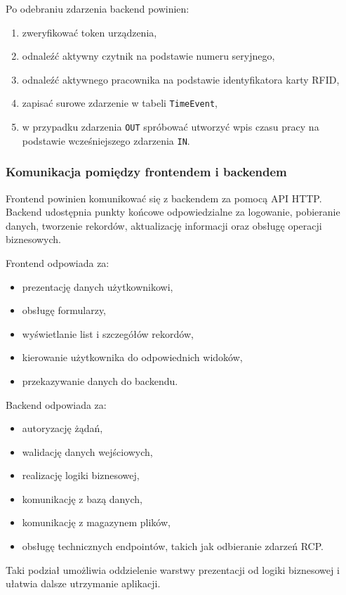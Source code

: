 Po odebraniu zdarzenia backend powinien:
\begin{enumerate}
    \item zweryfikować token urządzenia,
    \item odnaleźć aktywny czytnik na podstawie numeru seryjnego,
    \item odnaleźć aktywnego pracownika na podstawie identyfikatora karty RFID,
    \item zapisać surowe zdarzenie w tabeli \texttt{TimeEvent},
    \item w przypadku zdarzenia \texttt{OUT} spróbować utworzyć wpis czasu pracy na podstawie wcześniejszego zdarzenia \texttt{IN}.
\end{enumerate}

\subsubsection{Komunikacja pomiędzy frontendem i backendem}

Frontend powinien komunikować się z backendem za pomocą API HTTP. Backend udostępnia punkty końcowe odpowiedzialne za logowanie, pobieranie danych, tworzenie rekordów, aktualizację informacji oraz obsługę operacji biznesowych.

Frontend odpowiada za:
\begin{itemize}
    \item prezentację danych użytkownikowi,
    \item obsługę formularzy,
    \item wyświetlanie list i szczegółów rekordów,
    \item kierowanie użytkownika do odpowiednich widoków,
    \item przekazywanie danych do backendu.
\end{itemize}

Backend odpowiada za:
\begin{itemize}
    \item autoryzację żądań,
    \item walidację danych wejściowych,
    \item realizację logiki biznesowej,
    \item komunikację z bazą danych,
    \item komunikację z magazynem plików,
    \item obsługę technicznych endpointów, takich jak odbieranie zdarzeń RCP.
\end{itemize}

Taki podział umożliwia oddzielenie warstwy prezentacji od logiki biznesowej i ułatwia dalsze utrzymanie aplikacji.

